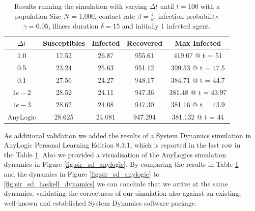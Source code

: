 \begin{table}
  \centering
  \begin{tabular}{ c || c | c | c | c }
    $\Delta t$ & Susceptibles & Infected & Recovered & Max Infected \\ \hline \hline 
    1.0 & 17.52 & 26.87 & 955.61 & 419.07 @ t = 51 \\ \hline
    0.5 & 23.24 & 25.63 & 951.12 & 399.53 @ t = 47.5 \\ \hline
    0.1 & 27.56 & 24.27 & 948.17 & 384.71 @ t = 44.7 \\ \hline
    $1e-2$ & 28.52 & 24.11 & 947.36 & 381.48 @ t = 43.97 \\ \hline
    $1e-3$ & 28.62 & 24.08 & 947.30 & 381.16 @ t = 43.9  \\ \hline \hline
    AnyLogic & 28.625 & 24.081 & 947.294 & 381.132 @ t = 44
    
  \end{tabular}
  \caption{Results running the simulation with varying $\Delta t$ until $t = 100$ with a population Size $N$ = 1,000, contact rate $\beta = \frac{1}{5}$, infection probability $\gamma = 0.05$, illness duration $\delta = 15$ and initially 1 infected agent.}
  \label{tab:delta_influence}
\end{table}

As additional validation we added the results of a System Dynamics simulation in AnyLogic Personal Learning Edition 8.3.1, which is reported in the last row in the Table \ref{tab:delta_influence}. Also we provided a visualisation of the AnyLogics simulation dynamics in Figure \ref{fig:sir_sd_anylogic}. By comparing the results in Table \ref{tab:delta_influence} and the dynamics in Figure \ref{fig:sir_sd_anylogic} to \ref{fig:sir_sd_haskell_dynamics} we can conclude that we arrive at the same dynamics, validating the correctness of our simulation also against an existing, well-known and established System Dynamics software package.


